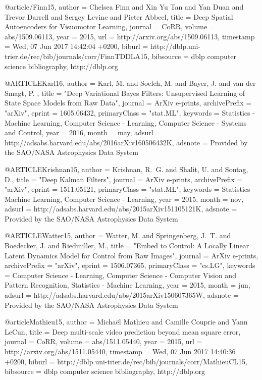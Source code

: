 @article{/Finn15,
  author    = {Chelsea Finn and
               Xin Yu Tan and
               Yan Duan and
               Trevor Darrell and
               Sergey Levine and
               Pieter Abbeel},
  title     = {Deep Spatial Autoencoders for Visuomotor Learning},
  journal   = {CoRR},
  volume    = {abs/1509.06113},
  year      = {2015},
  url       = {http://arxiv.org/abs/1509.06113},
  timestamp = {Wed, 07 Jun 2017 14:42:04 +0200},
  biburl    = {http://dblp.uni-trier.de/rec/bib/journals/corr/FinnTDDLA15},
  bibsource = {dblp computer science bibliography, http://dblp.org}
}


@ARTICLE{Karl16,
   author = {{Karl}, M. and {Soelch}, M. and {Bayer}, J. and {van der Smagt}, P.
	},
    title = "{Deep Variational Bayes Filters: Unsupervised Learning of State Space Models from Raw Data}",
  journal = {ArXiv e-prints},
archivePrefix = "arXiv",
   eprint = {1605.06432},
 primaryClass = "stat.ML",
 keywords = {Statistics - Machine Learning, Computer Science - Learning, Computer Science - Systems and Control},
     year = 2016,
    month = may,
   adsurl = {http://adsabs.harvard.edu/abs/2016arXiv160506432K},
  adsnote = {Provided by the SAO/NASA Astrophysics Data System}
}

@ARTICLE{Krishnan15,
   author = {{Krishnan}, R.~G. and {Shalit}, U. and {Sontag}, D.},
    title = "{Deep Kalman Filters}",
  journal = {ArXiv e-prints},
archivePrefix = "arXiv",
   eprint = {1511.05121},
 primaryClass = "stat.ML",
 keywords = {Statistics - Machine Learning, Computer Science - Learning},
     year = 2015,
    month = nov,
   adsurl = {http://adsabs.harvard.edu/abs/2015arXiv151105121K},
  adsnote = {Provided by the SAO/NASA Astrophysics Data System}
}

@ARTICLE{Watter15,
   author = {{Watter}, M. and {Springenberg}, J.~T. and {Boedecker}, J. and 
	{Riedmiller}, M.},
    title = "{Embed to Control: A Locally Linear Latent Dynamics Model for Control from Raw Images}",
  journal = {ArXiv e-prints},
archivePrefix = "arXiv",
   eprint = {1506.07365},
 primaryClass = "cs.LG",
 keywords = {Computer Science - Learning, Computer Science - Computer Vision and Pattern Recognition, Statistics - Machine Learning},
     year = 2015,
    month = jun,
   adsurl = {http://adsabs.harvard.edu/abs/2015arXiv150607365W},
  adsnote = {Provided by the SAO/NASA Astrophysics Data System}
}

@article{Mathieu15,
	author    = {Micha{\"{e}}l Mathieu and
		Camille Couprie and
		Yann LeCun},
	title     = {Deep multi-scale video prediction beyond mean square error},
	journal   = {CoRR},
	volume    = {abs/1511.05440},
	year      = {2015},
	url       = {http://arxiv.org/abs/1511.05440},
	timestamp = {Wed, 07 Jun 2017 14:40:36 +0200},
	biburl    = {http://dblp.uni-trier.de/rec/bib/journals/corr/MathieuCL15},
	bibsource = {dblp computer science bibliography, http://dblp.org}
}

